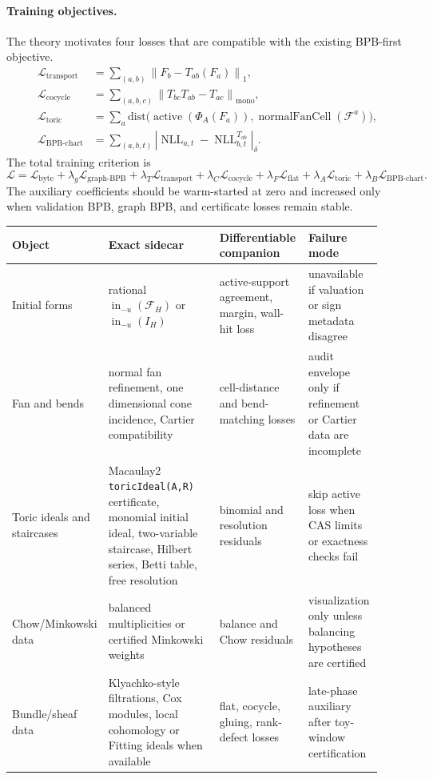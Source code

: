 \documentclass[11pt]{article}
\newcommand{\norm}[1]{\left\lVert #1\right\rVert}
\begin{document}
\paragraph{Training objectives.}
The theory motivates four losses that are compatible with the existing BPB-first objective.
\begin{align*}
\mathcal{L}_{\mathrm{transport}} &= \sum_{(a,b)} \norm{F_b - T_{ab}(F_a)}_1,\\
\mathcal{L}_{\mathrm{cocycle}} &= \sum_{(a,b,c)} \norm{T_{bc}T_{ab}-T_{ac}}_{\mathrm{mono}},\\
\mathcal{L}_{\mathrm{toric}} &= \sum_{a}\mathrm{dist}\bigl(\operatorname{active}(\Phi_A(F_a)),\operatorname{normalFanCell}(\mathcal{F}^{a})\bigr),\\
\mathcal{L}_{\mathrm{BPB\mbox{-}chart}} &= \sum_{(a,b,t)}\left|\operatorname{NLL}_{a,t}-\operatorname{NLL}_{b,t}^{T_{ab}}\right|_{\delta}.
\end{align*}
The total training criterion is
\[
\mathcal{L}=\mathcal{L}_{\mathrm{byte}}+\lambda_g\mathcal{L}_{\mathrm{graph\mbox{-}BPB}}+\lambda_T\mathcal{L}_{\mathrm{transport}}+
\lambda_C\mathcal{L}_{\mathrm{cocycle}}+\lambda_F\mathcal{L}_{\mathrm{flat}}+
\lambda_A\mathcal{L}_{\mathrm{toric}}+
\lambda_B\mathcal{L}_{\mathrm{BPB\mbox{-}chart}}.
\]
The auxiliary coefficients should be warm-started at zero and increased only when validation BPB, graph BPB, and certificate losses remain stable.

\begin{center}
\scriptsize
\begin{tabular}{@{}p{0.18\linewidth}p{0.30\linewidth}p{0.24\linewidth}p{0.20\linewidth}@{}}
\toprule
Object & Exact sidecar & Differentiable companion & Failure mode \\
\midrule
Initial forms & rational $\operatorname{in}_{-u}(\mathcal F_H)$ or $\operatorname{in}_{-u}(I_H)$ & active-support agreement, margin, wall-hit loss & unavailable if valuation or sign metadata disagree \\
Fan and bends & normal fan refinement, one dimensional cone incidence, Cartier compatibility & cell-distance and bend-matching losses & audit envelope only if refinement or Cartier data are incomplete \\
Toric ideals and staircases & Macaulay2 \texttt{toricIdeal(A,R)} certificate, monomial initial ideal, two-variable staircase, Hilbert series, Betti table, free resolution & binomial and resolution residuals & skip active loss when CAS limits or exactness checks fail \\
Chow/Minkowski data & balanced multiplicities or certified Minkowski weights & balance and Chow residuals & visualization only unless balancing hypotheses are certified \\
Bundle/sheaf data & Klyachko-style filtrations, Cox modules, local cohomology or Fitting ideals when available & flat, cocycle, gluing, rank-defect losses & late-phase auxiliary after toy-window certification \\
\bottomrule
\end{tabular}
\end{center}
\end{document}
